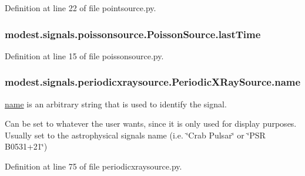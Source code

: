 Definition at line 22 of file pointsource.\+py.

\subsubsection[{\texorpdfstring{last\+Time}{lastTime}}]{\setlength{\rightskip}{0pt plus 5cm}modest.\+signals.\+poissonsource.\+Poisson\+Source.\+last\+Time\hspace{0.3cm}{\ttfamily [inherited]}}\hypertarget{classmodest_1_1signals_1_1poissonsource_1_1PoissonSource_a34395fc83bd8743a0a5ee69f9392a606}{}\label{classmodest_1_1signals_1_1poissonsource_1_1PoissonSource_a34395fc83bd8743a0a5ee69f9392a606}


Definition at line 15 of file poissonsource.\+py.

\subsubsection[{\texorpdfstring{name}{name}}]{\setlength{\rightskip}{0pt plus 5cm}modest.\+signals.\+periodicxraysource.\+Periodic\+X\+Ray\+Source.\+name}\hypertarget{classmodest_1_1signals_1_1periodicxraysource_1_1PeriodicXRaySource_aec42837776d331b803fe786647763be5}{}\label{classmodest_1_1signals_1_1periodicxraysource_1_1PeriodicXRaySource_aec42837776d331b803fe786647763be5}


\hyperlink{classmodest_1_1signals_1_1periodicxraysource_1_1PeriodicXRaySource_aec42837776d331b803fe786647763be5}{name} is an arbitrary string that is used to identify the signal. 

Can be set to whatever the user wants, since it is only used for display purposes. Usually set to the astrophysical signal\textquotesingle{}s name (i.\+e. \char`\"{}\+Crab Pulsar\char`\"{} or \char`\"{}\+P\+S\+R B0531+21\char`\"{}) 

Definition at line 75 of file periodicxraysource.\+py.

